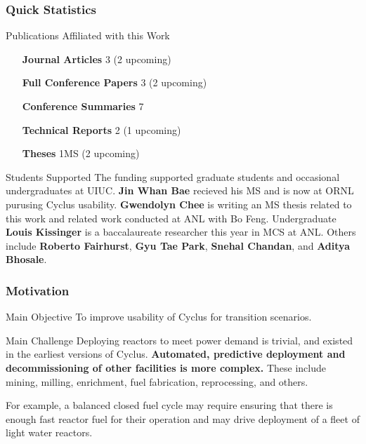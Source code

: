 \begin{frame}
        \frametitle{Quick Statistics}
        \begin{block}{Publications Affiliated with this Work}
                \begin{itemize}
                  \setlength{\itemindent}{3cm}
                        \item[\textbf{Journal Articles}] 3 (2 upcoming)
                        \item[\textbf{Full Conference Papers}] 3 (2 upcoming) 
                        \item[\textbf{Conference Summaries}] 7
                        \item[\textbf{Technical Reports}] 2 (1 upcoming)
                        \item[\textbf{Theses}] 1MS (2 upcoming)
                \end{itemize}
        \end{block}

                \begin{block}{Students Supported}
                        The funding supported graduate students and 
                        occasional undergraduates at UIUC.
                        \textbf{Jin Whan Bae} recieved his MS and is now at 
                        ORNL purusing Cyclus usability.
                        \textbf{Gwendolyn Chee} is writing an MS thesis related 
                        to this work and related work conducted at ANL with Bo Feng.
                        Undergraduate \textbf{Louis Kissinger} is a 
                        baccalaureate researcher this year in MCS at ANL.
                        Others include \textbf{Roberto Fairhurst}, \textbf{Gyu 
                        Tae Park}, \textbf{Snehal Chandan}, and \textbf{Aditya 
                        Bhosale}.
                \end{block}
\end{frame}

\begin{frame}
  \frametitle{Motivation}
        \begin{block}{Main Objective}
              To improve usability of Cyclus for transition scenarios.
        \end{block}
        

        \begin{block}{Main Challenge}
              Deploying reactors to meet power demand is trivial, and existed 
                in the earliest versions of Cyclus.
              \textbf{Automated, predictive deployment and decommissioning of 
                other facilities is more complex.} These include mining, 
                milling, enrichment, fuel 
                fabrication, reprocessing, and others. 

              For example, a balanced closed fuel cycle may require ensuring 
                that there is enough fast reactor fuel for their operation and 
                may drive deployment of a fleet of light water reactors.
        \end{block}
\end{frame}

